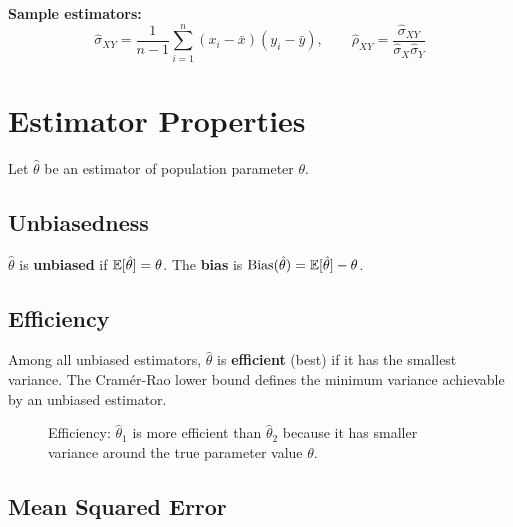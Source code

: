 \noindent\textbf{Sample estimators:}
\begin{equation}
  \hat{\sigma}_{XY} = \frac{1}{n-1}\sum_{i=1}^{n}(x_i-\bar{x})(y_i-\bar{y}),
  \qquad
  \hat{\rho}_{XY} = \frac{\hat{\sigma}_{XY}}{\hat{\sigma}_X\hat{\sigma}_Y}
\end{equation}


\section{Estimator Properties}
\label{sec_EstimatorProps}

Let $\hat{\theta}$ be an estimator of population parameter $\theta$.

\subsection{Unbiasedness}

$\hat{\theta}$ is \textbf{unbiased} if $\mathbb{E}[\hat{\theta}] = \theta$.
The \textbf{bias} is $\text{Bias}(\hat{\theta}) = \mathbb{E}[\hat{\theta}] - \theta$.

\subsection{Efficiency}

Among all unbiased estimators, $\hat{\theta}$ is \textbf{efficient} (best) if
it has the smallest variance. The Cramér-Rao lower bound defines the minimum
variance achievable by an unbiased estimator.

\begin{figure}[htp]
\centering
{}
\caption{Efficiency: $\hat\theta_1$ is more efficient than $\hat\theta_2$
because it has smaller variance around the true parameter value $\theta$.}
\label{fig_Efficiency}
\end{figure}

\subsection{Mean Squared Error}

